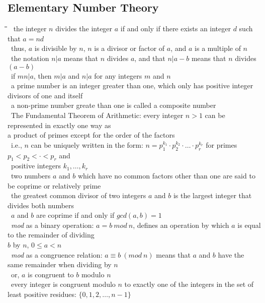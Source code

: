 \documentclass[10pt,letterpaper]{scrartcl}
\newcommand{\tbul}{\textbullet}
\newcommand{\tend}{\>\textendash}
\newcommand{\tabDef}{\hspace{2em}\=\hspace{2em}\=\hspace{2em}\=\hspace{2em}\=\kill}
\begin{document}
\subsection{Elementary Number Theory}\begin{tabbing}\tabDef
\tbul\ the integer $n$ divides the integer $a$ if and only if there exists an integer $d$ such that $a=nd$ \\
\tend\ thus, $a$ is divisible by $n$, $n$ is a divisor or factor of $a$, and $a$ is a multiple of $n$ \\
\tend\ the notation $n|a$ means that $n$ divides $a$, and that $n|a-b$ means that $n$ divides $(a-b)$ \\
\tbul\ if $mn|a$, then $m|a$ and $n|a$ for any integers $m$ and $n$ \\
\tbul\ a prime number is an integer greater than one, which only has positive integer divisors of one and itself \\
\tend\ a non-prime number greate than one is called a composite number \\
\tbul\ The Fundamental Theorem of Arithmetic: every integer $n>1$ can be represented in exactly one way as \\ a product of primes except for the order of the factors \\
\tend\ i.e., $n$ can be uniquely written in the form: $n=p_1^{k_1}\cdot p_2^{k_2}\cdot\ldots\cdot p_r^{k_r}$ for primes $p_1 < p_2 < \cdot < p_r$ and \\ \>\ positive integers $k_1,\ldots ,k_r$ \\
\tbul\ two numbers $a$ and $b$ which have no common factors other than one are said to be coprime or relatively prime \\
\tbul\ the greatest common divisor of two integers $a$ and $b$ is the largest integer that divides both numbers \\
\tbul\ $a$ and $b$ are coprime if and only if $gcd(a,b)=1$\\
\tbul\ \textit{mod} as a binary operation: $a = b\ mod \ n $, defines an operation by which $a$ is equal to the remainder of dividing \\ $b$ by $n$, $0\leq a < n$ \\
\tbul\ \textit{mod} as a congruence relation: $a \equiv b\ (mod\ n)$ means that $a$ and $b$ have the same remainder when dividing by $n$ \\
\tend\ or, $a$ is congruent to $b$ modulo $n$ \\
\tbul\ every integer is congruent modulo $n$ to exactly one of the integers in the set of least positive residues: $\{0,1,2,\ldots , n-1\}$ \\

\end{tabbing}
\end{document}
